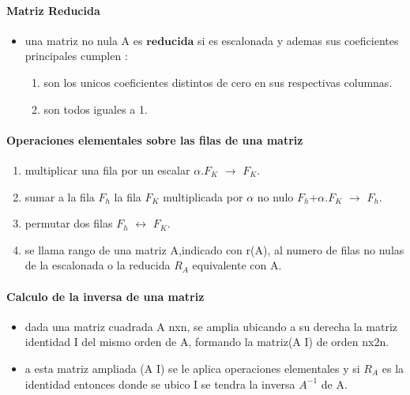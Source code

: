 \documentclass[a4paper]{article}
\begin{document}
\paragraph{Matriz Reducida}

\begin{itemize}
	\item una matriz no nula A es $\textbf{reducida}$ si es escalonada y ademas sus coeficientes principales cumplen :
	\begin{enumerate}
		\item son los unicos coeficientes distintos de cero en sus respectivas columnas.
		\item son todos iguales a 1.
	\end{enumerate}
\end{itemize}

\paragraph{Operaciones elementales sobre las filas de una matriz}
\begin{enumerate}
	\item multiplicar una fila por un escalar $\alpha.F_K$ $\longrightarrow$ $F_K$.
	\item sumar a la fila $F_h$ la fila $F_K$ multiplicada por $\alpha$ no nulo
	 $F_h$+$\alpha$.$F_K$ $\longrightarrow$ $F_h$. 
	\item permutar dos filas $F_h$ $\longleftrightarrow$ $F_K$.
	\item se llama rango de una matriz A,indicado con r(A), al numero de filas no nulas de la escalonada o la reducida $R_A$ equivalente con A.
\end{enumerate}

\paragraph{Calculo de la inversa de una matriz}
\begin{itemize}
	\item dada una matriz cuadrada A nxn, se amplia ubicando a su derecha la matriz identidad I del mismo orden de A, formando la matriz(A I) de orden nx2n.
	\item a esta matriz ampliada (A I) se le aplica operaciones elementales y si $R_A$ es la identidad entonces donde se ubico I se tendra la inversa $A^{-1}$ de A.
\end{itemize}
\end{document}
